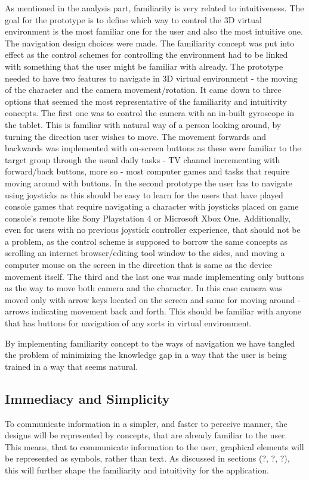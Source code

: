 As mentioned in the analysis part, familiarity is very related to intuitiveness. The goal for the prototype is to define which way to control the 3D virtual environment is the most familiar one for the user and also the most intuitive one. The navigation design choices were made. The familiarity concept was put into effect as the control schemes for controlling the environment had to be linked with something that the user might be familiar with already. The prototype needed to have two features to navigate in 3D virtual environment - the moving of the character and the camera movement/rotation. It came down to three options that seemed the most representative of the familiarity and intuitivity concepts. 
The first one was to control the camera with an in-built gyroscope in the tablet. This is familiar with natural way of a person looking around, by turning the direction user wishes to move. The movement forwards and backwards was implemented with on-screen buttons as these were familiar to the target group through the usual daily tasks - TV channel incrementing with forward/back buttons, more so - most computer games and tasks that require moving around with buttons. 
In the second prototype the user has to navigate using joysticks as this should be easy to learn for the users that have played console games that require navigating a character with joysticks placed on game console’s remote like Sony Playstation 4 or Microsoft Xbox One. Additionally, even for users with no previous joystick controller experience, that should not be a problem, as the control scheme is supposed to borrow the same concepts as scrolling an internet browser/editing tool window to the sides, and moving a computer mouse on the screen in the direction that is same as the device movement itself.
The third and the last one was made implementing only buttons as the way to move both camera and the character. In this case camera was moved only with arrow keys located on the screen and same for moving around - arrows indicating movement back and forth. This should be familiar with anyone that has buttons for navigation of any sorts in virtual environment. 


By implementing familiarity concept to the ways of navigation we have tangled the problem of minimizing the knowledge gap in a way that the user is being trained in a way that seems natural.


\subsection{Immediacy and Simplicity}
To communicate information in a simpler, and faster to perceive manner, the designs will be represented by concepts, that are already familiar to the user. This means, that to communicate information to the user, graphical elements will be represented as symbols, rather than text. As discussed in sections (?, ?, ?), this will further shape the familiarity and intuitivity for the application.


